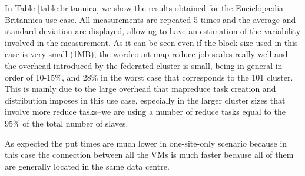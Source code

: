 \documentclass[oribibl]{llncs_Ibergrid2013}
\begin{document}
In Table \ref{table:britannica} we show the results obtained for the Enciclop{\ae}dia Britannica use case. All measurements are repeated 5 times and the average and standard deviation are displayed, allowing to have an estimation of the variability involved in the measurement. As it can be seen even if the block size used in this case is very small (1MB), the wordcount map reduce job scales really well and the overhead introduced by the federated cluster is small, being in general in order of 10-15\%, and 28\% in the worst case that corresponds to the 101 cluster. This is mainly due to the large overhead that mapreduce task creation and distribution imposes in this use case, especially in the larger cluster sizes that involve more reduce tasks--we are using a number of reduce tasks equal to the 95\% of the total number of slaves.

As expected the put times are much lower in one-site-only scenario because in this case the connection between all the VMs is much faster because all of them are generally located in the same data centre.
\end{document}
